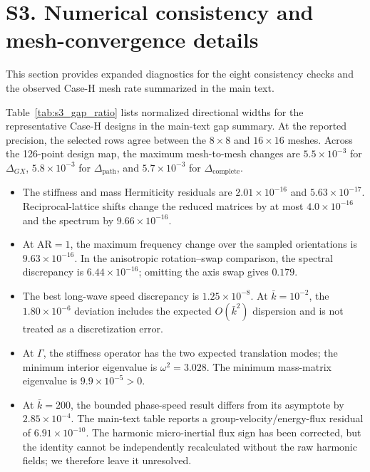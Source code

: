 \documentclass[preprint,12pt]{elsarticle}
\begin{document}
\section*{S3. Numerical consistency and mesh-convergence details}
This section provides expanded diagnostics for the eight consistency checks and the observed Case-H mesh rate summarized in the main text.

Table~\ref{tab:s3_gap_ratio} lists normalized directional widths for the representative Case-H designs in the main-text gap summary. At the reported precision, the selected rows agree between the $8\times8$ and $16\times16$ meshes. Across the 126-point design map, the maximum mesh-to-mesh changes are $5.5\times10^{-3}$ for $\Delta_{GX}$, $5.8\times10^{-3}$ for $\Delta_{\mathrm{path}}$, and $5.7\times10^{-3}$ for $\Delta_{\mathrm{complete}}$.
\begin{table}[htbp]
\centering
\caption{Normalized directional-gap widths for the representative Case-H designs.}
\label{tab:s3_gap_ratio}

\end{table}

\begin{itemize}
  \item The stiffness and mass Hermiticity residuals are $2.01\times10^{-16}$ and $5.63\times10^{-17}$. Reciprocal-lattice shifts change the reduced matrices by at most $4.0\times10^{-16}$ and the spectrum by $9.66\times10^{-16}$.
  \item At $\mathrm{AR}=1$, the maximum frequency change over the sampled orientations is $9.63\times10^{-16}$. In the anisotropic rotation--swap comparison, the spectral discrepancy is $6.44\times10^{-16}$; omitting the axis swap gives $0.179$.
  \item The best long-wave speed discrepancy is $1.25\times10^{-8}$. At $\bar{k}=10^{-2}$, the $1.80\times10^{-6}$ deviation includes the expected $O(\bar{k}^2)$ dispersion and is not treated as a discretization error.
  \item At $\Gamma$, the stiffness operator has the two expected translation modes; the minimum interior eigenvalue is $\omega^2=3.028$. The minimum mass-matrix eigenvalue is $9.9\times10^{-5}>0$.
  \item At $\bar{k}=200$, the bounded phase-speed result differs from its asymptote by $2.85\times10^{-4}$. The main-text table reports a group-velocity/energy-flux residual of $6.91\times10^{-10}$. The harmonic micro-inertial flux sign has been corrected, but the identity cannot be independently recalculated without the raw harmonic fields; we therefore leave it unresolved.
\end{itemize}
\end{document}
